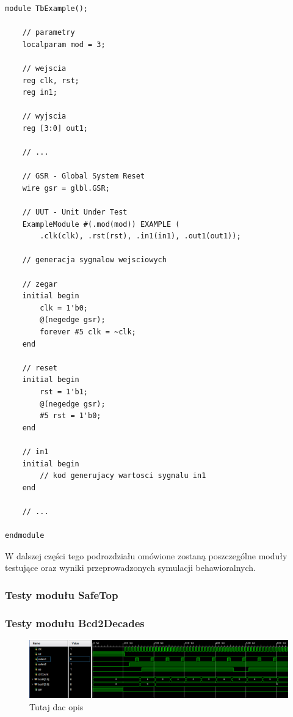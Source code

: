 \documentclass[12pt] {article}
\begin{document}
\begin{lstlisting}[style={verilog-style}, caption={Uproszczona struktura wykonanych modułów testujących}, label={lst:testy}]
module TbExample();
    
    // parametry    
    localparam mod = 3;    
    
    // wejscia
    reg clk, rst;
    reg in1;
    
    // wyjscia
    reg [3:0] out1; 
    
    // ...

    // GSR - Global System Reset
    wire gsr = glbl.GSR;

    // UUT - Unit Under Test
    ExampleModule #(.mod(mod)) EXAMPLE (
        .clk(clk), .rst(rst), .in1(in1), .out1(out1));

    // generacja sygnalow wejsciowych

    // zegar
    initial begin
        clk = 1'b0;
        @(negedge gsr);
        forever #5 clk = ~clk;
    end
    
    // reset
    initial begin
        rst = 1'b1;
        @(negedge gsr);
        #5 rst = 1'b0;
    end
    
    // in1
    initial begin 
        // kod generujacy wartosci sygnalu in1
    end
    
    // ...
    
endmodule
\end{lstlisting}
W dalszej części tego podrozdziału omówione zostaną poszczególne moduły testujące oraz wyniki przeprowadzonych symulacji behawioralnych. 

\subsubsection{Testy modułu SafeTop}

\subsubsection{Testy modułu Bcd2Decades}

\begin{figure}[H]
\centering
\includegraphics[width=\textwidth]{res/behav_sims/Bcd2Dec_behavSim_1.png}
\caption{Tutaj dac opis}
\end{figure}
\end{document}
